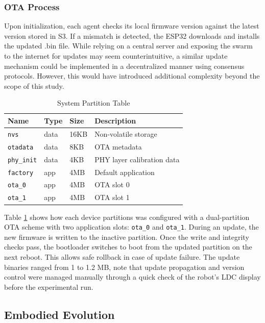 \documentclass[conference]{IEEEtran}
\begin{document}
\subsubsection{OTA Process}\label{sec:ota}

Upon initialization, each agent checks its local firmware version against the latest version stored in S3. If a mismatch is detected, the ESP32 downloads and installs the updated .bin file. While relying on a central server and exposing the swarm to the internet for updates may seem counterintuitive, a similar update mechanism could be implemented in a decentralized manner using consensus protocols. However, this would have introduced additional complexity beyond the scope of this study.\\

\begin{table}[h]
  \centering
  \caption{System Partition Table}
  \begin{tabular}{l l l p{4.3cm}}
  \toprule
  \textbf{Name} & \textbf{Type} & \textbf{Size} & \textbf{Description} \\
  \midrule
  \texttt{nvs} & data & 16KB & Non-volatile storage \\
  \texttt{otadata} & data & 8KB & OTA metadata \\
  \texttt{phy\_init} & data & 4KB & PHY layer calibration data \\
  \texttt{factory} & app & 4MB & Default application \\
  \texttt{ota\_0} & app & 4MB & OTA slot 0 \\
  \texttt{ota\_1} & app & 4MB & OTA slot 1 \\
  \bottomrule
  \end{tabular}
  \label{tab:partition_table}
\end{table}


Table \ref{tab:partition_table} shows how each device partitions was configured with a dual-partition OTA scheme with two application slots: \texttt{ota\_0} and \texttt{ota\_1}. During an update, the new firmware is written to the inactive partition. Once the write and integrity checks pass, the bootloader switches to boot from the updated partition on the next reboot. This allows safe rollback in case of update failure. The update binaries ranged from 1 to 1.2 MB, note that update propagation and version control were managed manually through a quick check of the robot's LDC display before the experimental run.

\subsection{Embodied Evolution}
\end{document}
